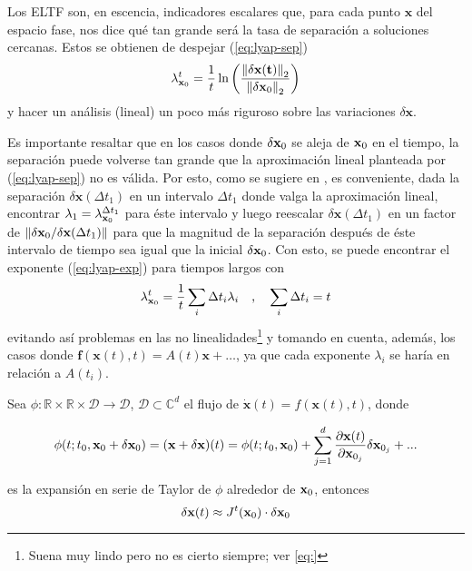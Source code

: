 Los ELTF son, en escencia, indicadores escalares que, para cada punto $\mathbf{x}$ del espacio fase, nos dice qué tan grande será la tasa de separación a soluciones cercanas. Estos se obtienen de despejar (\ref{eq:lyap-sep})
\begin{equation}
 \lambda_{\mathbf{x}_0}^t = \frac{1}{t}\ln \left( \frac{\left\lVert\mathbf{ \delta x(t)} \right\rVert_2}{\left\lVert \mathbf{\delta x}_0 \right\rVert_2} \right)
 \label{eq:lyap-exp}
\end{equation}
y hacer un análisis (lineal) un poco más riguroso sobre las variaciones $\delta \mathbf{x}$.

Es importante resaltar que en los casos donde $\delta \mathbf{x}_0$ se aleja de $\mathbf{x}_0$ en el tiempo, la separación puede volverse tan grande que la aproximación lineal planteada por (\ref{eq:lyap-sep}) no es válida. Por esto, como se sugiere en \cite{ChaosBook}, es conveniente, dada la separación  $\delta \mathbf{x}(\Delta t_1)$ en un intervalo $\Delta t_1$ donde valga la aproximación lineal, encontrar $\lambda_1 = \lambda_{\mathbf{x}_0}^{\Delta t_1}$ para éste intervalo y luego reescalar $\delta \mathbf{x}(\Delta t_1)$ en un factor de $\left\lVert \delta \mathbf{x}_0 / \delta \mathbf{x}(\Delta t_1) \right\rVert$ para que la magnitud de la separación después de éste intervalo de tiempo sea igual que la inicial $\delta \mathbf{x}_0$. Con esto, se puede encontrar el exponente (\ref{eq:lyap-exp}) para tiempos largos con
\begin{equation*}
 \lambda_{\mathbf{x}_0}^t = \frac{1}{t} \sum_{i} \Delta t_i \lambda_i
    \quad\text{,}\quad 
 \sum_i \Delta t_i = t
\end{equation*}
evitando así problemas en las no linealidades\footnote{Suena muy lindo pero no es cierto siempre; ver \ref{eq:} } y tomando en cuenta, además, los casos donde $\mathbf{f}(\mathbf{x}(t),t) = A(t)\mathbf{x} + \ldots $, ya que cada exponente $\lambda_i$ se haría en relación a $A(t_i)$.

Sea $\phi: \mathbb{R} \times \mathbb{R} \times \mathcal{D} \to \mathcal{D}$, $\mathcal{D} \subset \mathbb{C}^d$ el flujo de $\dot{\mathbf{x}}(t) = f(\mathbf{x}(t),t)$, donde

\begin{equation*}
 \phi(t;t_0,\mathbf{x}_0 + \delta \mathbf{x}_0) = (\mathbf{x + \delta x})(t) = \phi(t;t_0,\mathbf{x}_0) + \sum_{j=1}^d \frac{\partial \mathbf{x}(t)}{\partial \mathbf{x}_{0_j}}\delta \mathbf{x}_{0_j} + ...
\end{equation*}

es la expansión en serie de Taylor de $\phi$ alrededor de $\mathbf{x}_0$, entonces 
\begin{equation*}
 \delta \mathbf{x}(t) \approx J^t(\mathbf{x}_0) \cdot \delta \mathbf{x}_0
\end{equation*}

